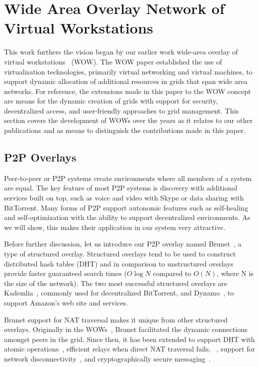 \documentclass[conference]{IEEEtran}
\begin{document}
\section{Wide Area Overlay Network of Virtual Workstations}

This work furthers the vision began by our earlier work wide-area overlay of
virtual workstations~\cite{wow} (WOW).  The WOW paper established the use of
virtualization technologies, primarily virtual networking and virtual machines,
to support dynamic allocation of additional resources in grids that span wide
area networks.  For reference, the extensions made in this paper to the WOW
concept are means for the dynamic creation of grids with support for security,
decentralized access, and user-friendly approaches to grid management.  This
section covers the development of WOWs over the years as it relates to our
other publications and as means to distinguish the contributions made in this
paper.

\subsection{P2P Overlays}

Peer-to-peer or P2P systems create environments where all members of a system
are equal.  The key feature of most P2P systems is discovery with additional
services built on top, such as voice and video with Skype or data sharing with
BitTorrent.  Many forms of P2P support autonomic features such as self-healing
and self-optimization with the ability to support decentralized environments.
As we will show, this makes their application in our system very attractive.

Before further discussion, let us introduce our P2P overlay named
Brunet~\cite{brunet}, a type of structured overlay.  Structured overlays tend
to be used to construct distributed hash tables (DHT) and in comparison to
unstructured overlays provide faster guaranteed search times ($O\log N$
compared to $O(N)$, where N is the size of the network).  The two most
successful structured overlays are Kademlia~\cite{kademlia}, commonly used for
decentralized BitTorrent, and Dynamo~\cite{dynamo}, to support Amazon's web
site and services.

Brunet support for NAT traversal makes it unique from other structured
overlays.  Originally in the WOWs~\cite{wow}, Brunet facilitated the dynamic
connections amongst peers in the grid.  Since then, it has been extended to
support DHT with atomic operations~\cite{pcgrid07}, efficient relays when
direct NAT traversal fails, ~\cite{groupvpn}, support for network
disconnectivity~\cite{hpdc08_0}, and cryptographically secure
messaging~\cite{groupvpn}.
\end{document}
